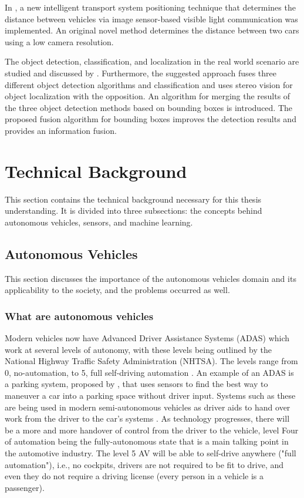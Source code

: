 In \cite{Tram2018}, a new intelligent transport system positioning technique that determines the distance between vehicles via image sensor-based visible light communication was implemented. An original novel method determines the distance between two cars using a low camera resolution.

The object detection, classification, and localization in the real world scenario are studied and discussed by \cite{Hofmann2019}. Furthermore, the suggested approach fuses three different object detection algorithms and classification and uses stereo vision for object localization with the opposition. An algorithm for merging the results of the three object detection methods based on bounding boxes is introduced. The proposed fusion algorithm for bounding boxes improves the detection results and provides an information fusion.



\section{Technical Background}
This section contains the technical background necessary for this thesis understanding. It is divided into three subsections: the concepts behind autonomous vehicles, sensors, and machine learning.

\subsection{Autonomous Vehicles} \label{autonomous-vehicles}

This section discusses the importance of the autonomous vehicles domain and its applicability to the society, and the problems occurred as well. 

\subsubsection{What are autonomous vehicles}
Modern vehicles now have Advanced Driver Assistance Systems (ADAS)
which work at several levels of autonomy, with these levels being
outlined by the National Highway Traffic Safety Administration
(NHTSA). The levels range from 0, no-automation, to 5, full self-driving automation \cite{national2013preliminary}. An example of an ADAS is a parking system, proposed by \cite{krasner2016automatic}, that uses sensors to find the best way to maneuver a car into a parking space without driver input. Systems such as these are being used in modern semi-autonomous
vehicles as driver aids to hand over work from the driver to the
car’s systems \cite{schoning2006parklenkassistent}. As technology progresses, there will be a more
and more handover of control from the driver to the vehicle, level
Four of automation being the fully-autonomous state that is a main talking point in the automotive industry. The level 5 AV will
be able to self-drive anywhere ("full automation"), i.e., no cockpits,
drivers are not required to be fit to drive, and even they do not require a driving license (every person in a vehicle is a passenger).

